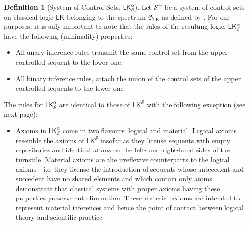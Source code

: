 \documentclass{article}                     %
\theoremstyle{theorem}
\theoremstyle{corollary}
\theoremstyle{lemma}
\theoremstyle{definition}
\newtheorem{definition}[section]{Definition}
\theoremstyle{remark}
\theoremstyle{definition}
\theoremstyle{notation}
\theoremstyle{definition}
\theoremstyle{proposition}
\theoremstyle{definition}
\begin{document}
\begin{definition}[System of Control-Sets, $\mathsf{LK}^\alpha_\mathcal{S} $]
	Let $ \mathcal{S^+} $ be a system of control-sets on classical logic $ \mathsf{LK} $ belonging to the spectrum  $\mathfrak{G}_\mathsf{LK} $ as defined by \textcite{Piazza2015}. For our purposes, it is only important to note that the rules of the resulting logic, $\mathsf{LK}^\alpha_\mathcal{S} $ have the following (minimality) properties:
	\begin{itemize}
		\item All unary inference rules transmit the same control set from the upper controlled sequent to the lower one.
		
		\item All binary inference rules, attach the union of the control sets of the upper controlled sequents to the lower one.
	\end{itemize}
	The rules for $ \mathsf{LK}^\alpha_\mathcal{S} $ are identical to those of $ \mathsf{LK}^\mathcal{S} $ with the following exception (see next page):
	
	\begin{itemize}

		\item Axioms in $ \mathsf{LK}^\alpha_\mathcal{S} $ come in two flavours: logical and material. Logical axioms resemble the axioms of $ \mathsf{LK}^\mathcal{S} $ insofar as they license sequents with empty repositories and identical atoms on the left- and right-hand sides of the turnstile. Material axioms are the irreflexive counterparts to the logical axioms---i.e. they license the introduction of sequents whose antecedent and succedent have no shared elements and which contain only atoms.  \textcite{Piazza2016} demonstrate that classical systems with  proper axioms having these properties preserve cut-elimination. These material axioms are intended to represent material inferences and hence the point of contact between logical theory and scientific practice. 


	\end{itemize}

\end{definition}
\end{document}
